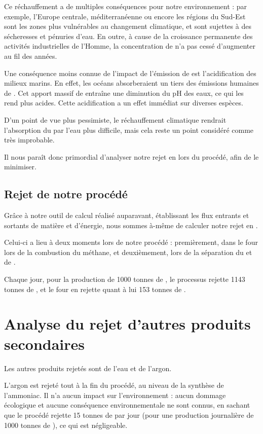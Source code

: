 \documentclass[a4paper, oneside]{scrartcl}
\begin{document}
Ce réchauffement a de multiples conséquences pour notre environnement : par exemple, l'Europe centrale, méditerranéenne ou encore les régions du Sud-Est sont les zones plus vulnérables au changement climatique, et sont sujettes à des sécheresses et pénuries d'eau. En outre, à cause de la croissance permanente des activités industrielles de l'Homme, la concentration de  n'a pas cessé d'augmenter au fil des années.
 

Une conséquence moins connue de l’impact de l’émission de  est l’acidification des milieux marins. En effet, les océans absorberaient un tiers des émissions humaines de . Cet apport massif de  entraîne une diminution du pH des eaux, ce qui les rend plus acides. Cette acidification a un effet immédiat sur diverses espèces.

D’un point de vue plus pessimiste, le réchauffement climatique rendrait l’absorption du  par l’eau plus difficile, mais cela reste un point considéré comme très improbable.
 

Il nous paraît donc primordial d'analyser notre rejet en  lors du procédé, afin de le minimiser.

\subsection{Rejet de notre procédé}
Grâce à notre outil de calcul réalisé auparavant, établissant les flux entrants et sortants de matière et d'énergie, nous sommes à-même de calculer notre rejet en .

Celui-ci a lieu à deux moments lors de notre procédé : premièrement, dans le four lors de la combustion du méthane, et deuxièmement, lors de la séparation du  et de .

Chaque jour, pour la production de 1000 tonnes de , le processus rejette 1143 tonnes de , et le four en rejette quant à lui 153 tonnes de .

\section{Analyse du rejet d'autres produits secondaires}
Les autres produits rejetés sont de l'eau et de l'argon.
 

L'argon est rejeté tout à la fin du procédé, au niveau de la synthèse de l'ammoniac. Il n'a aucun impact sur l'environnement : aucun dommage écologique et aucune conséquence environnementale ne sont connus, en sachant que le procédé rejette 15 tonnes de  par jour (pour une production journalière de 1000 tonnes de ), ce qui est négligeable.
 
\end{document}
